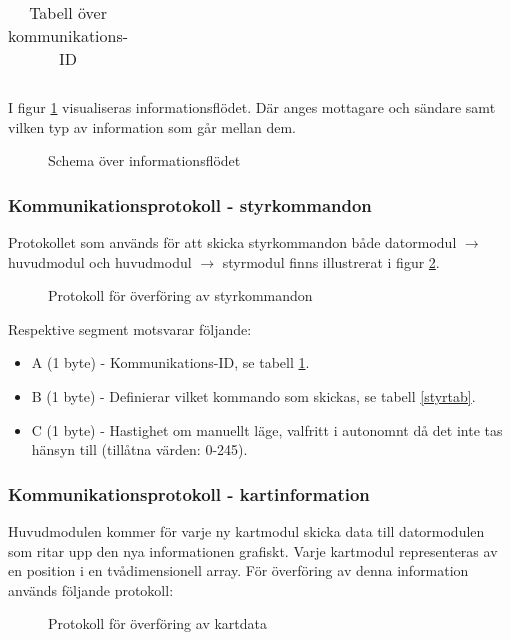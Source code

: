 \documentclass[11pt]{article}
\begin{document}
\begin{flushleft}
\begin{longtable}[l]{| l | l |}
\caption{Tabell över kommunikations-ID}\label{kommunikationstab}
\end{longtable}

I figur \ref{informationFlow} visualiseras informationsflödet. Där anges mottagare och sändare samt vilken typ av information som går mellan dem.

\begin{figure}[htbp]
\centering
\noindent\resizebox{1\linewidth}{!}{
	}
	\caption{Schema över informationsflödet\label{informationFlow}}	
\end{figure}

\subsubsection{Kommunikationsprotokoll - styrkommandon}
Protokollet som används för att skicka styrkommandon både datormodul $\rightarrow$ huvudmodul och huvudmodul $\rightarrow$ styrmodul finns illustrerat i figur \ref{styrdata}.

\begin{figure}[htbp]
\centering
\noindent\resizebox{.8\linewidth}{!}{
	}
	\caption{Protokoll för överföring av styrkommandon\label{styrdata}}	
\end{figure}

Respektive segment motsvarar följande: 
\begin{itemize}
	\item A (1 byte) - Kommunikations-ID, se tabell \ref{kommunikationstab}.
	\item B (1 byte) - Definierar vilket kommando som skickas, se tabell \ref{styrtab}.
	\item C (1 byte) - Hastighet om manuellt läge, valfritt i autonomnt då det inte tas hänsyn till (tillåtna värden: 0-245).
\end{itemize}

\subsubsection{Kommunikationsprotokoll - kartinformation}
Huvudmodulen kommer för varje ny kartmodul skicka data till datormodulen som ritar upp den nya informationen grafiskt. Varje kartmodul representeras av en position i en tvådimensionell array. För överföring av denna information används följande protokoll:

 \begin{figure}[H]
\centering
\noindent\resizebox{.8\linewidth}{!}{
	}
	\caption{Protokoll för överföring av kartdata \label{kartdata}}	
\end{figure} 


\end{flushleft}
\end{document}
